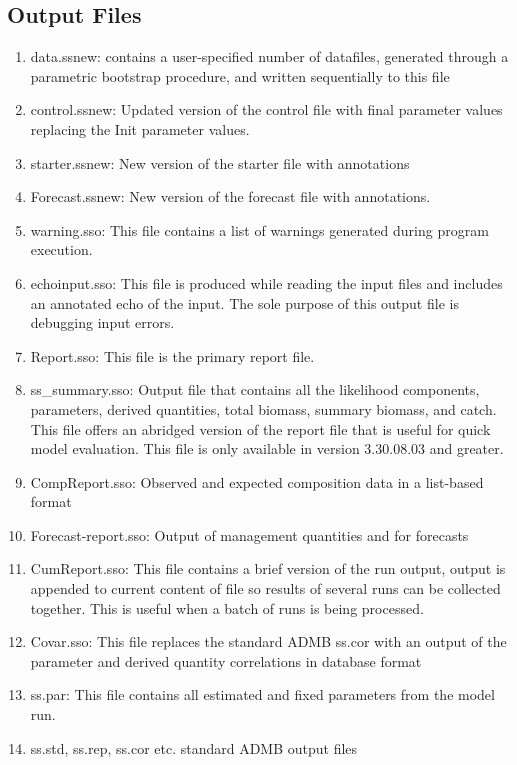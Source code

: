 	\subsection{Output Files}
	\begin{enumerate}
		\item data.ss\textunderscore new:  contains a user-specified number of datafiles, generated through a parametric bootstrap procedure, and written sequentially to this file
		\item control.ss\textunderscore new:  Updated version of the control file with final parameter values replacing the Init parameter values.
		\item starter.ss\textunderscore new:  New version of the starter file with annotations
		\item Forecast.ss\textunderscore new:  New version of the forecast file with annotations.
		\item warning.sso:  This file contains a list of warnings generated during program execution.
		\item echoinput.sso:  This file is produced while reading the input files and includes an annotated echo of the input.  The sole purpose of this output file is debugging input errors.
		\item Report.sso:  This file is the primary report file.
		\item ss\_summary.sso: Output file that contains all the likelihood components, parameters, derived quantities, total biomass, summary biomass, and catch. This file offers an abridged version of the report file that is useful for quick model evaluation. This file is only available in version 3.30.08.03 and greater.
		\item CompReport.sso:  Observed and expected composition data in a list-based format
		\item Forecast-report.sso:  Output of management quantities and for forecasts
		\item CumReport.sso:  This file contains a brief version of the run output, output is appended to current content of file so results of several runs can be collected together.  This is useful when a batch of runs is being processed.
		\item Covar.sso:  This file replaces the standard ADMB ss.cor with an output of the parameter and derived quantity correlations in database format
		\item ss.par: This file contains all estimated and fixed parameters from the model run. 
		\item ss.std, ss.rep, ss.cor etc.  standard ADMB output files

\end{enumerate}
